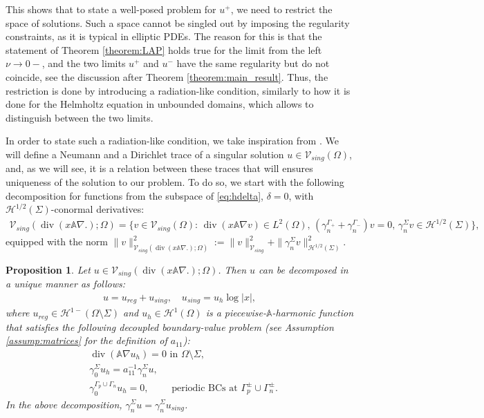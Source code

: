 \documentclass[report]{elsarticle}
\newtheorem{proposition}[theorem]{Proposition}
\numberwithin{theorem}{section}
\begin{document}
This shows that to state a well-posed problem for $u^+$, we need to restrict the space of solutions. Such a space cannot be singled out by imposing the regularity constraints, as it is typical in elliptic PDEs. The reason for this is that the statement of Theorem \ref{theorem:LAP} holds true for the limit from the left $\nu\rightarrow 0-$, and the two limits $u^+$ and $u^-$ have the same regularity but do not coincide, see the discussion after Theorem \ref{theorem:main_result}. Thus, the restriction is done by introducing a radiation-like condition, similarly to how it is done for the Helmholtz equation in unbounded domains, which allows to distinguish between the two limits. 

In order to state such a radiation-like condition, we take inspiration from \cite{ciarlet_mk_peillon}. We will define a Neumann and a Dirichlet trace of a singular solution $u\in \mathcal{V}_{sing}(\Omega)$, and, as we will see, it is a relation between these traces that will ensures uniqueness of the solution to our problem. To do so, we start with the following decomposition for functions from the subspace of  \eqref{eq:hdelta}, $\delta=0$, with $\mathcal{H}^{1/2}(\Sigma)$-conormal derivatives:
\begin{align}
	\label{eq:defvsing}
	\mathcal{V}_{sing}(\operatorname{div}(x\mathbb{A}\nabla.); \Omega)=\{v\in \mathcal{V}_{sing}(\Omega): \, \operatorname{div}(x\mathbb{A}\nabla v)\in L^2(\Omega), \, (\gamma_n^{\Gamma_+}+\gamma_n^{\Gamma_-})v=0,\, \gamma_n^{\Sigma}v\in \mathcal{H}^{1/2}(\Sigma)\}, 
\end{align}
equipped with the norm $
\|v\|_{	\mathcal{V}_{sing}(\operatorname{div}(x\mathbb{A}\nabla.); \Omega)}^2:=\|v\|_{\mathcal{V}_{sing}}^2+\|\gamma_n^{\Sigma}v\|^2_{\mathcal{H}^{1/2}(\Sigma)}.$
\begin{proposition}
	\label{prop:decomp1}
	Let $u\in 	\mathcal{V}_{sing}(\operatorname{div}(x\mathbb{A}\nabla.); \Omega)$. 
	Then $u$ can be decomposed in a unique manner as follows: 
	\begin{align}
		\label{eq:decomp_pi0}
		u=u_{reg}+u_{sing},\quad u_{sing}=u_h\log|x|,
	\end{align}
	where $u_{reg}\in \mathcal{H}^{1-}(\Omega\setminus\Sigma)$ and $u_h\in \mathcal{H}^1(\Omega)$ is a piecewise-$\mathbb{A}$-harmonic function that satisfies the following decoupled boundary-value problem (see Assumption \ref{assump:matrices} for the definition of $a_{11}$):
	\begin{align*}
		&\operatorname{div}(\mathbb{A}\nabla u_h)=0 \text{ in }\Omega\setminus \Sigma, \\
		&\gamma_0^{\Sigma}u_h=a_{11}^{-1}\gamma_n^{\Sigma}u,\\
		& \gamma_0^{\Gamma_p\cup\Gamma_n}u_h=0,\qquad
		\text{ periodic BCs at $\Gamma^{\pm}_p\cup\Gamma^{\pm}_n$}. %
	\end{align*}
	In the above decomposition,  $\gamma_n^{\Sigma}u=\gamma_n^{\Sigma}u_{sing}$. 
\end{proposition}
\end{document}
